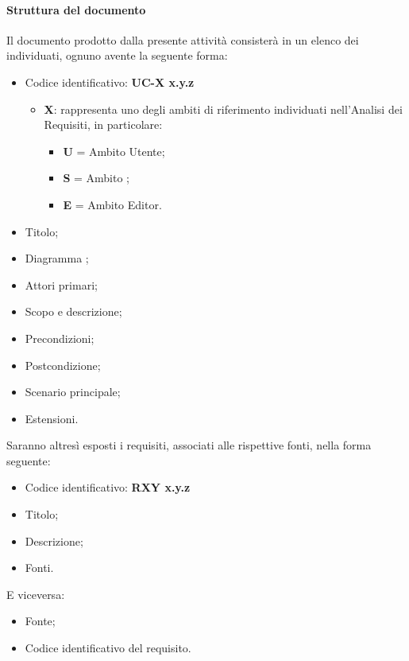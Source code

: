 			\paragraph*{Struttura del documento}
			Il documento prodotto dalla presente attivit\`a consister\`a in un elenco dei  individuati, 
                        ognuno avente la seguente forma:
				\begin{itemize}
				\item Codice identificativo: \textbf{UC-{X} x.y.z}
						\begin{itemize}
						\item \textbf{X}: rappresenta uno degli ambiti di riferimento individuati
						nell'Analisi dei Requisiti, in particolare:
							\begin{itemize}
							\item [] \textbf{U} = Ambito Utente;
							\item [] \textbf{S} = Ambito ;
							\item [] \textbf{E} = Ambito Editor. 
							\end{itemize}
						\end{itemize}
				\item Titolo;
				\item Diagramma ;
				\item Attori primari;
				\item Scopo e descrizione;
				\item Precondizioni;
				\item Postcondizione;
				\item Scenario principale;
                                \item Estensioni.
				\end{itemize}
			Saranno altresì esposti i requisiti, associati alle rispettive fonti, nella forma seguente:
				\begin{itemize}
				\item Codice identificativo: \textbf{R{X}{Y} x.y.z}
				\item Titolo;
				\item Descrizione;
                \item Fonti.
				\end{itemize}
			E viceversa:
				\begin{itemize}
				\item Fonte;
				\item Codice identificativo del requisito.
				\end{itemize}

